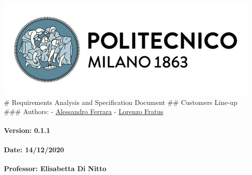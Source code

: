 \includegraphics{assets/polimi_logo.jpg} \# Requirements Analysis and
Specification Document \#\# Customers Line-up \#\#\# Authors: -
\href{https://github.com/ferrohd}{Alessandro Ferrara} -
\href{https://github.com/lorenzofratus}{Lorenzo Fratus}

\hypertarget{version-0.1.1}{%
\paragraph{\texorpdfstring{Version: 0.1.1
}{Version: 0.1.1 }}\label{version-0.1.1}}

\hypertarget{date-14122020}{%
\paragraph{\texorpdfstring{Date: 14/12/2020
}{Date: 14/12/2020 }}\label{date-14122020}}

\hypertarget{professor-elisabetta-di-nitto}{%
\paragraph{\texorpdfstring{Professor: Elisabetta Di Nitto
}{Professor: Elisabetta Di Nitto }}\label{professor-elisabetta-di-nitto}}


